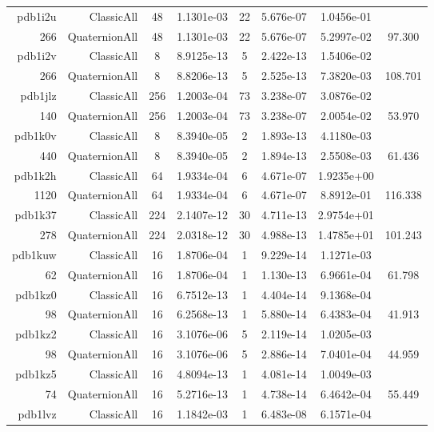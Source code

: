 \begin{xltabular}{\textwidth}{r|rcS[table-format=1.4e+2]cS[table-format=1.3e+2]S[table-format=1.4e+2]S[table-format=-1.3]}
pdb1i2u & ClassicAll & 48 & 1.1301e-03 & 22 & 5.676e-07 & 1.0456e-01 & \\
266 & QuaternionAll & 48 & 1.1301e-03 & 22 & 5.676e-07 & 5.2997e-02 & 97.300\\  \addlinespace
pdb1i2v & ClassicAll & 8 & 8.9125e-13 & 5 & 2.422e-13 & 1.5406e-02 & \\
266 & QuaternionAll & 8 & 8.8206e-13 & 5 & 2.525e-13 & 7.3820e-03 & 108.701\\  \addlinespace
pdb1jlz & ClassicAll & 256 & 1.2003e-04 & 73 & 3.238e-07 & 3.0876e-02 & \\
140 & QuaternionAll & 256 & 1.2003e-04 & 73 & 3.238e-07 & 2.0054e-02 & 53.970\\  \addlinespace
pdb1k0v & ClassicAll & 8 & 8.3940e-05 & 2 & 1.893e-13 & 4.1180e-03 & \\
440 & QuaternionAll & 8 & 8.3940e-05 & 2 & 1.894e-13 & 2.5508e-03 & 61.436\\  \addlinespace
pdb1k2h & ClassicAll & 64 & 1.9334e-04 & 6 & 4.671e-07 & 1.9235e+00 & \\
1120 & QuaternionAll & 64 & 1.9334e-04 & 6 & 4.671e-07 & 8.8912e-01 & 116.338\\  \addlinespace
pdb1k37 & ClassicAll & 224 & 2.1407e-12 & 30 & 4.711e-13 & 2.9754e+01 & \\
278 & QuaternionAll & 224 & 2.0318e-12 & 30 & 4.988e-13 & 1.4785e+01 & 101.243\\  \addlinespace
pdb1kuw & ClassicAll & 16 & 1.8706e-04 & 1 & 9.229e-14 & 1.1271e-03 & \\
62 & QuaternionAll & 16 & 1.8706e-04 & 1 & 1.130e-13 & 6.9661e-04 & 61.798\\  \addlinespace
pdb1kz0 & ClassicAll & 16 & 6.7512e-13 & 1 & 4.404e-14 & 9.1368e-04 & \\
98 & QuaternionAll & 16 & 6.2568e-13 & 1 & 5.880e-14 & 6.4383e-04 & 41.913\\  \addlinespace
pdb1kz2 & ClassicAll & 16 & 3.1076e-06 & 5 & 2.119e-14 & 1.0205e-03 & \\
98 & QuaternionAll & 16 & 3.1076e-06 & 5 & 2.886e-14 & 7.0401e-04 & 44.959\\  \addlinespace
pdb1kz5 & ClassicAll & 16 & 4.8094e-13 & 1 & 4.081e-14 & 1.0049e-03 & \\
74 & QuaternionAll & 16 & 5.2716e-13 & 1 & 4.738e-14 & 6.4642e-04 & 55.449\\  \addlinespace
pdb1lvz & ClassicAll & 16 & 1.1842e-03 & 1 & 6.483e-08 & 6.1571e-04 & \\

\end{xltabular}
